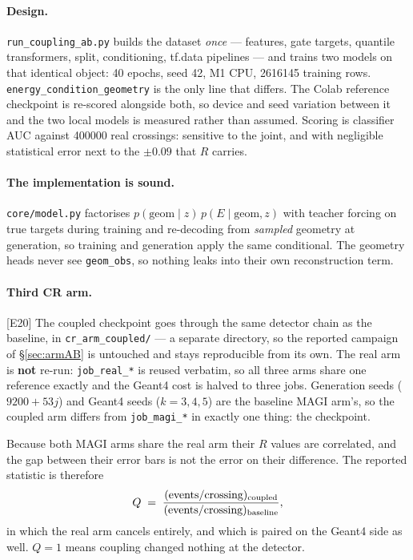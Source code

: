 \documentclass[11pt,a4paper]{article}
\newcommand{\ev}[1]{{\footnotesize\textcolor{prov}{[#1]}}}
\begin{document}
\paragraph{Design.} \texttt{run\_coupling\_ab.py} builds the dataset \emph{once}
--- features, gate targets, quantile transformers, split, conditioning, tf.data
pipelines --- and trains two models on that identical object: 40 epochs, seed 42,
M1 CPU, \num{2616145} training rows. \texttt{energy\_condition\_geometry} is the
only line that differs. The Colab reference checkpoint is re-scored alongside
both, so device and seed variation between it and the two local models is
measured rather than assumed. Scoring is classifier AUC against \num{400000} real
crossings: sensitive to the joint, and with negligible statistical error next to
the $\pm0.09$ that $R$ carries.

\paragraph{The implementation is sound.} \texttt{core/model.py} factorises
$p(\mathrm{geom}\mid z)\,p(E\mid\mathrm{geom},z)$ with teacher forcing on true
targets during training and re-decoding from \emph{sampled} geometry at
generation, so training and generation apply the same conditional. The geometry
heads never see \texttt{geom\_obs}, so nothing leaks into their own
reconstruction term.

\paragraph{Third CR arm.} \ev{E20} The coupled checkpoint goes through the same
detector chain as the baseline, in \texttt{cr\_arm\_coupled/} --- a separate
directory, so the reported campaign of \S\ref{sec:armAB} is untouched and stays
reproducible from its own. The real arm is \textbf{not} re-run:
\texttt{job\_real\_*} is reused verbatim, so all three arms share one reference
exactly and the Geant4 cost is halved to three jobs. Generation seeds
($9200+53j$) and Geant4 seeds ($k=3,4,5$) are the baseline MAGI arm's, so the
coupled arm differs from \texttt{job\_magi\_*} in exactly one thing: the
checkpoint.

Because both MAGI arms share the real arm their $R$ values are correlated, and
the gap between their error bars is not the error on their difference. The
reported statistic is therefore
\[
Q \;=\; \frac{(\text{events}/\text{crossing})_{\rm coupled}}
             {(\text{events}/\text{crossing})_{\rm baseline}},
\]
in which the real arm cancels entirely, and which is paired on the Geant4 side as
well. $Q = 1$ means coupling changed nothing at the detector.
\end{document}
